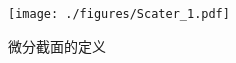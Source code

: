 

\begin{figure}[ht]
\centering
\texttt{[image: ./figures/Scater\_1.pdf]}
\caption{微分截面的定义} \label{Scater_fig1}
\end{figure}
